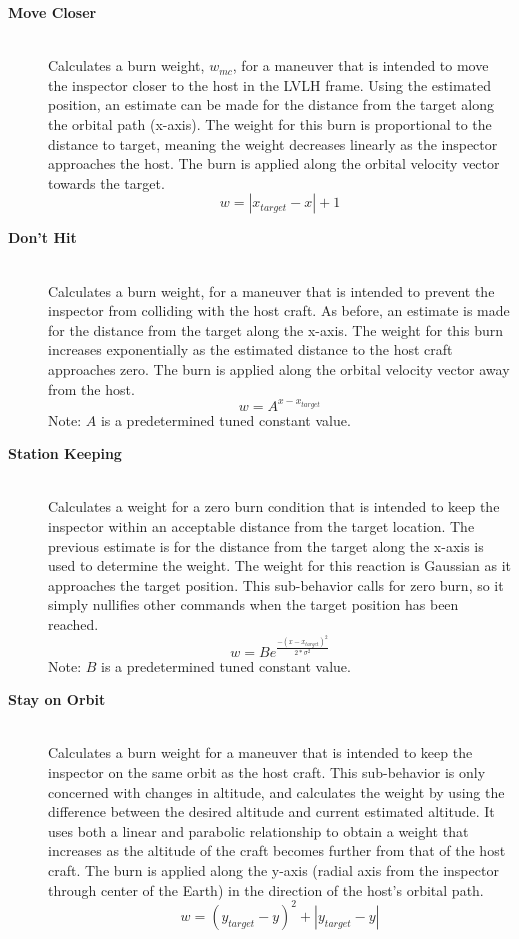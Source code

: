\documentclass[journal, 10pt]{IEEEtran}
\begin{document}
\begin{description}
\item[\textbf{Move Closer}] \hfill \\
Calculates a burn weight, $w_{mc}$, for a maneuver that is intended to move the inspector closer to the host in the LVLH frame.  Using the estimated position, an estimate can be made for the distance from the target along the orbital path (x-axis).  The weight for this burn is proportional to the distance to target, meaning the weight decreases linearly as the inspector approaches the host.  The burn is applied along the orbital velocity vector towards the target.
\begin{equation}
w = |x_{target}-x|+1
\end{equation}

\item[\textbf{Don't Hit}] \hfill \\
Calculates a burn weight, for a maneuver that is intended to prevent the inspector from colliding with the host craft.  As before, an estimate is made for the distance from the target along the x-axis.  The weight for this burn increases exponentially as the estimated distance to the host craft approaches zero.  The burn is applied along the orbital velocity vector away from the host.
\begin{equation}
w = A^{x-x_{target}}
\end{equation}
Note: $A$ is a predetermined tuned constant value. \\

\item[\textbf{Station Keeping}] \hfill \\
Calculates a weight for a zero burn condition that is intended to keep the inspector within an acceptable distance from the target location.  The previous estimate is for the distance from the target along the x-axis is used to determine the weight.  The weight for this reaction is Gaussian as it approaches the target position.  This sub-behavior calls for zero burn, so it simply nullifies other commands when the target position has been reached.
\begin{equation}
w = Be^{\frac{-(x-x_{target})^2}{2*\sigma^2}}
\end{equation}
Note: $B$ is a predetermined tuned constant value. \\

\item[\textbf{Stay on Orbit}] \hfill \\
Calculates a burn weight for a maneuver that is intended to keep the inspector on the same orbit as the host craft.  This sub-behavior is only concerned with changes in altitude, and calculates the weight by using the difference between the desired altitude and current estimated altitude.  It uses both a linear and parabolic relationship to obtain a weight that increases as the altitude of the craft becomes further from that of the host craft.  The burn is applied along the y-axis (radial axis from the inspector through center of the Earth) in the direction of the host's orbital path.
\begin{equation}
w = (y_{target}-y)^2+|y_{target}-y|
\end{equation}


\end{description}
\end{document}
